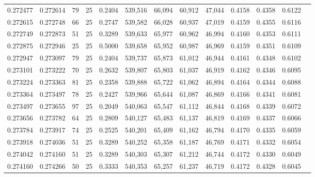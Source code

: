 \begin{tabular}{rrrrrrrrrrrrr}
0.272477 & 0.272614 &    79 &  25 &                                     0.2404 & 539,516 &  66,094 &  60,912 &  47,044 & 0.4158 & 0.4358 & 0.6122 \\
0.272615 & 0.272748 &    66 &  25 &                                     0.2747 & 539,582 &  66,028 &  60,937 &  47,019 & 0.4159 & 0.4355 & 0.6116 \\
0.272749 & 0.272873 &    51 &  25 &                                     0.3289 & 539,633 &  65,977 &  60,962 &  46,994 & 0.4160 & 0.4353 & 0.6111 \\
0.272875 & 0.272946 &    25 &  25 &                                     0.5000 & 539,658 &  65,952 &  60,987 &  46,969 & 0.4159 & 0.4351 & 0.6109 \\
0.272947 & 0.273097 &    79 &  25 &                                     0.2404 & 539,737 &  65,873 &  61,012 &  46,944 & 0.4161 & 0.4348 & 0.6102 \\
0.273101 & 0.273222 &    70 &  25 &                                     0.2632 & 539,807 &  65,803 &  61,037 &  46,919 & 0.4162 & 0.4346 & 0.6095 \\
0.273224 & 0.273363 &    81 &  25 &                                     0.2358 & 539,888 &  65,722 &  61,062 &  46,894 & 0.4164 & 0.4344 & 0.6088 \\
0.273364 & 0.273497 &    78 &  25 &                                     0.2427 & 539,966 &  65,644 &  61,087 &  46,869 & 0.4166 & 0.4341 & 0.6081 \\
0.273497 & 0.273655 &    97 &  25 &                                     0.2049 & 540,063 &  65,547 &  61,112 &  46,844 & 0.4168 & 0.4339 & 0.6072 \\
0.273656 & 0.273782 &    64 &  25 &                                     0.2809 & 540,127 &  65,483 &  61,137 &  46,819 & 0.4169 & 0.4337 & 0.6066 \\
0.273784 & 0.273917 &    74 &  25 &                                     0.2525 & 540,201 &  65,409 &  61,162 &  46,794 & 0.4170 & 0.4335 & 0.6059 \\
0.273918 & 0.274036 &    51 &  25 &                                     0.3289 & 540,252 &  65,358 &  61,187 &  46,769 & 0.4171 & 0.4332 & 0.6054 \\
0.274042 & 0.274160 &    51 &  25 &                                     0.3289 & 540,303 &  65,307 &  61,212 &  46,744 & 0.4172 & 0.4330 & 0.6049 \\
0.274160 & 0.274266 &    50 &  25 &                                     0.3333 & 540,353 &  65,257 &  61,237 &  46,719 & 0.4172 & 0.4328 & 0.6045 \\

\end{tabular}
